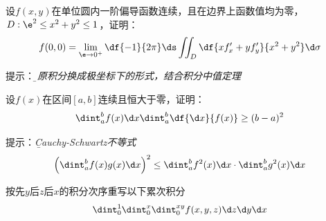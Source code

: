 \begin{frame}
	\linespread{2}
	设$f(x,y)$在单位圆内一阶偏导函数连续，且在边界上函数值均为零，
	$D:\e^2\leq x^2+y^2\leq 1$，证明：
	$$f(0,0)=\lim\limits_{\e\to0^+}\df{-1}{2\pi}
	\ds\iint_D\df{xf'_x+yf'_y}{x^2+y^2}\d\sigma$$
	
	\pause\alert{提示：}{\it\b 将原积分换成极坐标下的形式，结合积分中值定理
	}
\end{frame}

\begin{frame}
	\linespread{2}
	设$f(x)$在区间$[a,b]$连续且恒大于零，证明：
		$$\dint_a^bf(x)\d x\dint_a^b\df{\d x}{f(x)}\geq (b-a)^2$$
	
	\pause\alert{提示：}{\it\b Cauchy-Schwartz不等式
	$$\left(\dint_a^bf(x)g(x)\d x\right)^2
	\leq\dint_a^bf^2(x)\d x\cdot\dint_a^bg^2(x)\d x$$
	}
\end{frame}

\begin{frame}
	\linespread{2}
	按先$y$后$z$后$x$的积分次序重写以下累次积分
	$$\dint_0^1\dint_0^x\dint_0^{xy}f(x,y,z)\d z\d y\d x$$
	\begin{center}
		\pause {}
	\end{center}
\end{frame}

